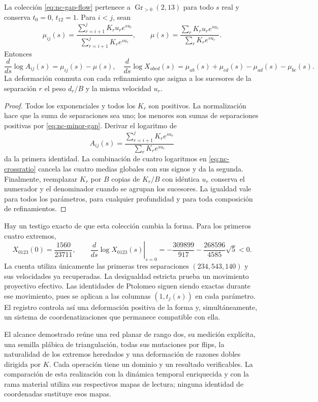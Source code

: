 \begin{theorem}
\label{thm:nc-shape-flow}
La colección \eqref{eq:nc-gap-flow} pertenece a
\(\operatorname{Gr}_{>0}(2,13)\) para todo \(s\) real y conserva
\(t_0=0\), \(t_{12}=1\). Para \(i<j\), sean
\[
 \mu_{ij}(s)=
 \frac{\sum_{r=i+1}^jK_ru_re^{su_r}}{\sum_{r=i+1}^jK_re^{su_r}},
 \qquad
 \mu(s)=\frac{\sum_rK_ru_re^{su_r}}{\sum_rK_re^{su_r}}.
\]
Entonces
\begin{equation}
 \frac{d}{ds}\log A_{ij}(s)=\mu_{ij}(s)-\mu(s),
 \quad
 \frac{d}{ds}\log X_{abcd}(s)
 =\mu_{ab}(s)+\mu_{cd}(s)-\mu_{ad}(s)-\mu_{bc}(s).
 \label{eq:nc-crossratio-derivative}
\end{equation}
La deformación conmuta con cada refinamiento que asigna a los sucesores de la
separación \(r\) el peso \(d_r/B\) y la misma velocidad \(u_r\).
\end{theorem}
\begin{proof}
Todos los exponenciales y todos los \(K_r\) son positivos. La normalización
hace que la suma de separaciones sea uno; los menores son sumas de
separaciones positivas por \eqref{eq:nc-minor-gap}. Derivar el logaritmo de
\[
 A_{ij}(s)=\frac{\sum_{r=i+1}^jK_re^{su_r}}
                      {\sum_rK_re^{su_r}}
\]
da la primera identidad. La combinación de cuatro logaritmos en
\eqref{eq:nc-crossratio} cancela las cuatro medias globales con sus signos
y da la segunda. Finalmente, reemplazar \(K_r\) por \(B\) copias de
\(K_r/B\) con idéntica \(u_r\) conserva el numerador y el denominador
cuando se agrupan los sucesores. La igualdad vale para todos los parámetros,
para cualquier profundidad y para toda composición de refinamientos.
\end{proof}

Hay un testigo exacto de que esta colección cambia la forma. Para los primeros
cuatro extremos,
\begin{equation}
 X_{0123}(0)=\frac{1560}{23711},\qquad
 \left.\frac{d}{ds}\log X_{0123}(s)\right|_{s=0}
 =-\frac{309899}{917}-\frac{268596}{4585}\sqrt5<0.
 \label{eq:nc-nontrivial-witness}
\end{equation}
La cuenta utiliza únicamente las primeras tres separaciones
\((234,543,140)\) y sus velocidades ya recuperadas. La desigualdad
estricta prueba un movimiento proyectivo efectivo. Las identidades de
Ptolomeo siguen siendo exactas durante ese movimiento, pues se aplican a
las columnas \((1,t_j(s))\) en cada parámetro. El registro controla así
una deformación positiva de la forma y, simultáneamente, un sistema de
coordenatizaciones que permanece compatible con ella.

El alcance demostrado reúne una red planar de rango dos, su medición
explícita, una semilla plábica de triangulación, todas sus mutaciones por
flips, la naturalidad de los extremos heredados y una deformación de
razones dobles dirigida por \(K\). Cada operación tiene un dominio y un
resultado verificables. La comparación de esta realización con la
dinámica temporal enriquecida y con la rama material utiliza sus respectivos
mapas de lectura; ninguna identidad de coordenadas sustituye esos mapas.
